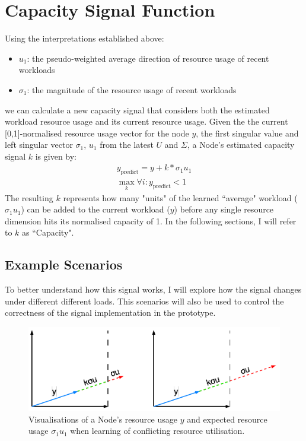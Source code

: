 \section{Capacity Signal Function}
\label{sec:capacity-signal}
Using the interpretations established above:
\begin{itemize}
    \item $u_1$: the pseudo-weighted average direction of resource usage of
        recent workloads
    \item $\sigma_1$: the magnitude of the resource usage of recent workloads
\end{itemize}
we can calculate a new capacity signal that considers both the estimated
workload resource usage and its current resource usage. Given the the current
[0,1]-normalised resource usage vector for the node $y$, the first singular
value and left singular vector $\sigma_1$, $u_1$ from the latest $U$ and
$\Sigma$, a Node's estimated capacity signal $k$ is given by:
\begin{align}
    y_{\text{predict}} = y + k * \sigma_1 u_1 \\
    \max_k \forall i: y_{\text{predict}} < 1
\end{align}
The resulting $k$ represents how many "units" of the learned ``average" workload
($\sigma_1 u_1$) can be added to the current workload ($y$) before any single
resource dimension hits its normalised capacity of 1. In the following sections,
I will refer to $k$ as ``Capacity".

%
\subsection{Example Scenarios}
\label{sec:signal-example-scenario}
To better understand how this signal works, I will explore how the signal
changes under different different loads. This scenarios will also be used to
control the correctness of the signal implementation in the prototype.

\begin{figure}[ht]
    \centering
    \includegraphics[width=\textwidth]{images/conflicting-workload.pdf}
    \caption{Visualisations of a Node's resource usage $y$ and expected resource
    usage $\sigma_1 u_1$ when learning of conflicting resource utilisation.}
    \label{fig:conflicting-workload}
\end{figure}

